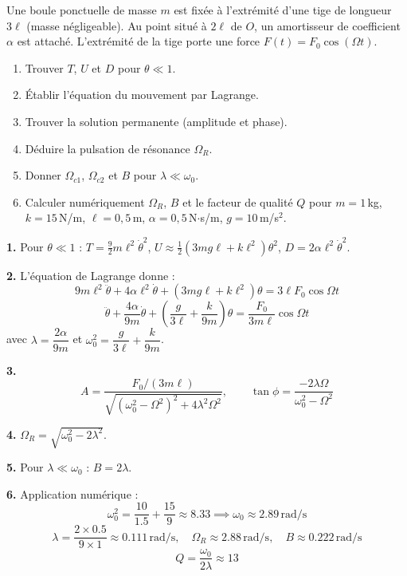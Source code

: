 \documentclass[12pt,a4paper]{article}
\begin{document}
\begin{boiteexercice}
Une boule ponctuelle de masse $m$ est fixée à l'extrémité d'une tige de longueur $3\ell$ (masse négligeable). Au point situé à $2\ell$ de $O$, un amortisseur de coefficient $\alpha$ est attaché. L'extrémité de la tige porte une force $F(t) = F_0\cos(\Omega t)$.
\begin{enumerate}
  \item Trouver $T$, $U$ et $D$ pour $\theta \ll 1$.
  \item Établir l'équation du mouvement par Lagrange.
  \item Trouver la solution permanente (amplitude et phase).
  \item Déduire la pulsation de résonance $\Omega_R$.
  \item Donner $\Omega_{c1}$, $\Omega_{c2}$ et $B$ pour $\lambda \ll \omega_0$.
  \item Calculer numériquement $\Omega_R$, $B$ et le facteur de qualité $Q$ pour $m=1$\,kg, $k=15$\,N/m, $\ell=0{,}5$\,m, $\alpha=0{,}5$\,N$\cdot$s/m, $g=10$\,m/s$^2$.
\end{enumerate}
\end{boiteexercice}

\begin{boitecorrige}
\textbf{1.} Pour $\theta\ll1$ : $T = \frac{9}{2}m\ell^2\dot\theta^2$, $U \approx \frac{1}{2}(3mg\ell + k\ell^2)\theta^2$, $D = 2\alpha\ell^2\dot\theta^2$.

\textbf{2.} L'équation de Lagrange donne :
\[
9m\ell^2\ddot\theta + 4\alpha\ell^2\dot\theta + (3mg\ell + k\ell^2)\theta = 3\ell F_0\cos\Omega t
\]
\[
\ddot\theta + \frac{4\alpha}{9m}\dot\theta + \left(\frac{g}{3\ell}+\frac{k}{9m}\right)\theta = \frac{F_0}{3m\ell}\cos\Omega t
\]
avec $\lambda = \dfrac{2\alpha}{9m}$ et $\omega_0^2 = \dfrac{g}{3\ell}+\dfrac{k}{9m}$.

\textbf{3.}
\[
A = \frac{F_0/(3m\ell)}{\sqrt{(\omega_0^2-\Omega^2)^2+4\lambda^2\Omega^2}}, \qquad \tan\phi = \frac{-2\lambda\Omega}{\omega_0^2-\Omega^2}
\]

\textbf{4.} $\Omega_R = \sqrt{\omega_0^2 - 2\lambda^2}$.

\textbf{5.} Pour $\lambda \ll \omega_0$ : $B = 2\lambda$.

\textbf{6.} Application numérique :
\[
\omega_0^2 = \frac{10}{1.5} + \frac{15}{9} \approx 8.33 \implies \omega_0 \approx 2.89\,\text{rad/s}
\]
\[
\lambda = \frac{2\times 0.5}{9\times 1} \approx 0.111\,\text{rad/s}, \quad \Omega_R \approx 2.88\,\text{rad/s}, \quad B \approx 0.222\,\text{rad/s}
\]
\[
Q = \frac{\omega_0}{2\lambda} \approx 13
\]
\end{boitecorrige}
\end{document}
